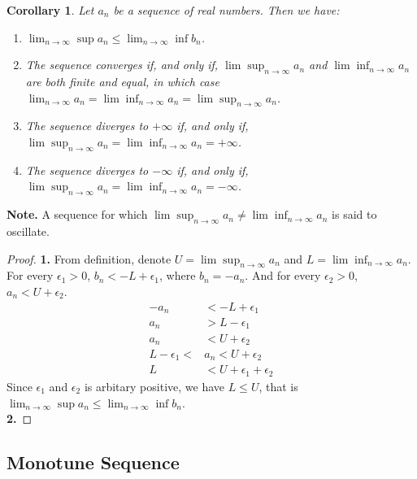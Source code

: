 \documentclass{article}
\newtheorem{corollary}[theorem]{Corollary}
\theoremstyle{definition}
\begin{document}
\begin{corollary}
Let $a_{n}$ be a sequence of real numbers. Then we have:
\begin{enumerate}
    \item $\lim_{n\rightarrow \infty}\sup a_{n}\leq\lim_{n\rightarrow \infty}\inf b_{n}$.
    \item The sequence converges if, and only if, $\lim\sup_{n\rightarrow \infty}a_{n}$ and 
    $\lim\inf_{n\rightarrow \infty}a_{n}$ are both finite and equal, in which case 
    $\lim_{n\rightarrow \infty}a_{n}=\lim\inf_{n\rightarrow \infty}a_{n}=\lim\sup_{n\rightarrow \infty}a_{n}$.
    \item The sequence diverges to $+\infty$ if, and only if, $\lim\sup_{n\rightarrow \infty}a_{n}=\lim\inf_{n\rightarrow \infty}a_{n}=+\infty$.
    \item The sequence diverges to $-\infty$ if, and only if, $\lim\sup_{n\rightarrow \infty}a_{n}=\lim\inf_{n\rightarrow \infty}a_{n}=-\infty$.
\end{enumerate}
\end{corollary}


\textbf{Note.} A sequence for which $\lim\sup_{n\rightarrow \infty}a_{n}\neq\lim\inf_{n\rightarrow \infty}a_{n} $ is said to oscillate.\\
\begin{proof}
\textbf{1.}
From definition, denote $U=\lim\sup_{n\rightarrow \infty}a_{n}$ and $L=\lim\inf_{n\rightarrow \infty}a_{n}$.
For every $\epsilon_{1}>0$, $b_{n}<-L+\epsilon_{1}$, where $b_{n}=-a_{n}$. And for every $\epsilon_{2}>0$, $a_{n}<U+\epsilon_{2}$.
\begin{align*}
    -a_{n} &< -L + \epsilon_{1} \\
    a_{n} &> L - \epsilon_{1} \\
    a_{n} &< U + \epsilon_{2} \\
    L - \epsilon_{1} < &a_{n} < U + \epsilon_{2} \\
    L &< U + \epsilon_{1} + \epsilon_{2}
\end{align*}
Since $\epsilon_{1}$ and $\epsilon_{2}$ is arbitary positive, 
we have $L\leq U$, that is $\lim_{n\rightarrow \infty}\sup a_{n}\leq\lim_{n\rightarrow \infty}\inf b_{n}$.\\
\textbf{2.}


\end{proof}

\subsection{Monotune Sequence}
\end{document}
